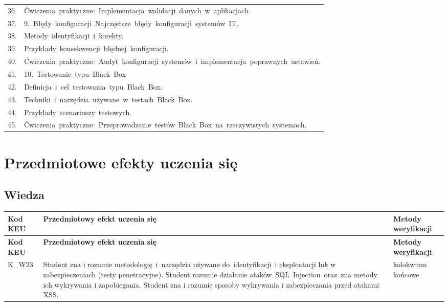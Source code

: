 \documentclass[12pt, a4paper]{article}
\newcommand{\thdrule}{\noalign{\global\setlength{\extrarowheight}{0pt}}}
\newcommand{\thdend}{\noalign{\global\setlength{\extrarowheight}{3pt}}}
\begin{document}
{\begin{longtable}{m{1.5cm}m{14.5cm}}
  \rowcolor{tableRowAlt} 36. & Ćwiczenia praktyczne: Implementacja walidacji danych w aplikacjach. \\
  \rowcolor{tableRowLight} 37. & 9. Błędy konfiguracji Najczęstsze błędy konfiguracji systemów IT. \\
  \rowcolor{tableRowAlt} 38. & Metody identyfikacji i korekty. \\
  \rowcolor{tableRowLight} 39. & Przykłady konsekwencji błędnej konfiguracji. \\
  \rowcolor{tableRowAlt} 40. & Ćwiczenia praktyczne: Audyt konfiguracji systemów i implementacja poprawnych ustawień. \\
  \rowcolor{tableRowLight} 41. & 10. Testowanie typu Black Box \\
  \rowcolor{tableRowAlt} 42. & Definicja i cel testowania typu Black Box. \\
  \rowcolor{tableRowLight} 43. & Techniki i narzędzia używane w testach Black Box. \\
  \rowcolor{tableRowAlt} 44. & Przykłady scenariuszy testowych. \\
  \rowcolor{tableRowLight} 45. & Ćwiczenia praktyczne: Przeprowadzanie testów Black Box na rzeczywistych systemach. \\
\bottomrule
\end{longtable}}

\section{Przedmiotowe efekty uczenia się}

\subsection*{Wiedza}
{\scriptsize
\begin{longtable}{m{1.6cm}m{9.0cm}m{4.2cm}}
\thdrule\toprule
\rowcolor{pjatkRed} {\color{white}\footnotesize\textbf{\vphantom{Ag}Kod KEU}} & {\color{white}\footnotesize\textbf{\vphantom{Ag}Przedmiotowy efekt uczenia się}} & {\color{white}\footnotesize\textbf{\vphantom{Ag}Metody weryfikacji}} \\
\midrule\thdend
\endfirsthead
\thdrule\toprule
\rowcolor{pjatkRed} {\color{white}\footnotesize\textbf{\vphantom{Ag}Kod KEU}} & {\color{white}\footnotesize\textbf{\vphantom{Ag}Przedmiotowy efekt uczenia się}} & {\color{white}\footnotesize\textbf{\vphantom{Ag}Metody weryfikacji}} \\
\midrule\thdend
\endhead
  \rowcolor{tableRowLight} K\_W23 & Student zna i rozumie metodologię i narzędzia używane do identyfikacji i eksploatacji luk w zabezpieczeniach (testy penetracyjne). Student rozumie działanie  ataków SQL Injection oraz zna metody ich wykrywania i zapobiegania. Student zna i rozumie sposoby wykrywania i zabezpieczania przed atakami XSS. & kolokwium końcowe \\
\bottomrule
\end{longtable}}
\end{document}
